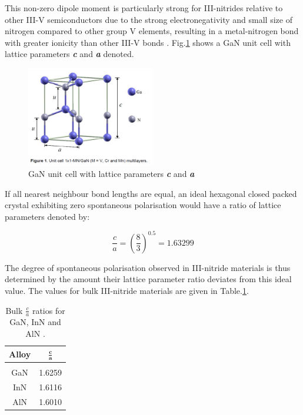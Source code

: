 This non-zero dipole moment is particularly strong for III-nitrides relative to other III-V semiconductors due to the strong electronegativity and small size of nitrogen compared to other group V elements, resulting in a metal-nitrogen bond with greater ionicity than other III-V bonds \cite{wood2007polarization}. Fig.\ref{1.4} shows a GaN unit cell with lattice parameters {\textbf {\it c}} and \textbf{\it a} denoted.

\begin{figure}[h]
	\centering
	\includegraphics[width=0.5\textwidth]{Figs/Ch1/2unit.png}
	\caption {GaN unit cell with lattice parameters \textbf{\it c} and \textbf{\it a} \cite{Miguel2014}}
	\label{1.4}
\end{figure}
\FloatBarrier 

If all nearest neighbour bond lengths are equal, an ideal hexagonal closed packed crystal exhibiting zero spontaneous polarisation would have a ratio of lattice parameters denoted by:

\begin{equation}
\frac{c}{a}= (\frac{8}{3})^{0.5} = 1.63299
\end{equation} 

The degree of spontaneous polarisation observed in III-nitride materials is thus determined by the amount their lattice parameter ratio deviates from this ideal value. The values for bulk III-nitride materials are given in Table.\ref{tab1.3}. 

\begin{table}[!htb]
	\centering
	\label{tab1.1}
	\begin{tabular}{cc}
		\textbf{Alloy} &  $\mathbf{\frac{c}{a}}$ \\
		\hline\hline\\
		GaN   & 1.6259      \\
		InN   & 1.6116     \\
		AlN   & 1.6010   \\ 
		\hline
	\end{tabular}
	\caption{Bulk $\frac{c}{a}$ ratios for GaN, InN and AlN \cite{Ren2015}.}
	\label{tab1.3}
\end{table}

